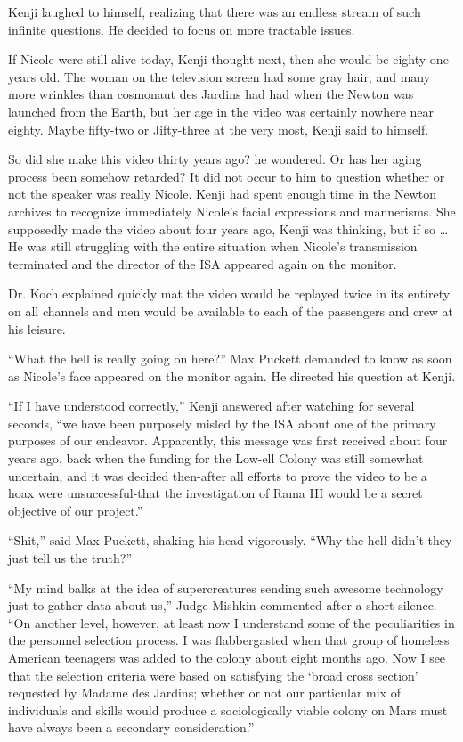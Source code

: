 \documentclass[]{article}
\begin{document}
{Kenji laughed to himself, realizing that there was an endless stream of such infinite questions. He decided to focus on more tractable issues.

If Nicole were still alive today, Kenji thought next, then she would be eighty-one years old. The woman on the television screen had some gray hair, and many more wrinkles than cosmonaut des Jardins had had when the Newton was launched from the Earth, but her age in the video was certainly nowhere near eighty. Maybe fifty-two or Jifty-three at the very most, Kenji said to himself.

So did she make this video thirty years ago? he wondered. Or has her aging process been somehow retarded? It did not occur to him to question whether or not the speaker was really Nicole. Kenji had spent enough time in the Newton archives to recognize immediately Nicole’s facial expressions and mannerisms. She supposedly made the video about four years ago, Kenji was thinking, but if so … He was still struggling with the entire situation when Nicole’s transmission terminated and the director of the ISA appeared again on the monitor.

Dr. Koch explained quickly mat the video would be replayed twice in its entirety on all channels and men would be available to each of the passengers and crew at his leisure.

“What the hell is really going on here?” Max Puckett demanded to know as soon as Nicole’s face appeared on the monitor again. He directed his question at Kenji.

“If I have understood correctly,” Kenji answered after watching for several seconds, “we have been purposely misled by the ISA about one of the primary purposes of our endeavor. Apparently, this message was first received about four years ago, back when the funding for the Low-ell Colony was still somewhat uncertain, and it was decided then-after all efforts to prove the video to be a hoax were unsuccessful-that the investigation of Rama III would be a secret objective of our project.”

“Shit,” said Max Puckett, shaking his head vigorously. “Why the hell didn’t they just tell us the truth?”

“My mind balks at the idea of supercreatures sending such awesome technology just to gather data about us,” Judge Mishkin commented after a short silence. “On another level, however, at least now I understand some of the peculiarities in the personnel selection process. I was flabbergasted when that group of homeless American teenagers was added to the colony about eight months ago. Now I see that the selection criteria were based on satisfying the ‘broad cross section’ requested by Madame des Jardins; whether or not our particular mix of individuals and skills would produce a sociologically viable colony on Mars must have always been a secondary consideration.”

}
\end{document}
